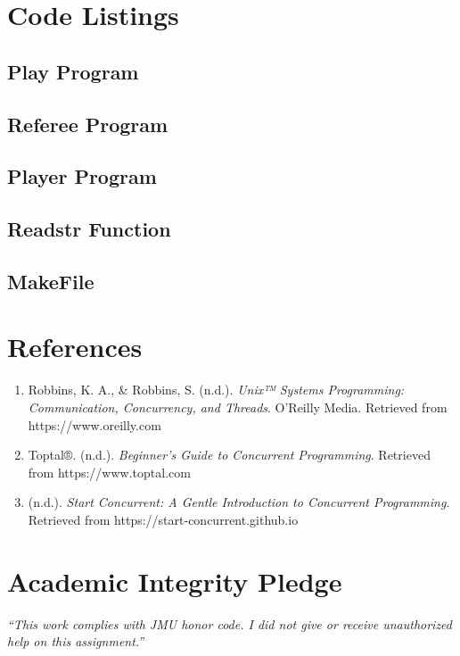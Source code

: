 \documentclass{article}
\begin{document}
\section{Code Listings}
\subsection{Play Program}


\subsection{Referee Program}


\subsection{Player Program}


\subsection{Readstr Function}


\subsection{MakeFile}


\section*{References}

\begin{enumerate}
  \item Robbins, K. A., \& Robbins, S. (n.d.). \textit{Unix™ Systems Programming: Communication, Concurrency, and Threads}. O'Reilly Media. Retrieved from https://www.oreilly.com
  \item Toptal®. (n.d.). \textit{Beginner's Guide to Concurrent Programming}. Retrieved from https://www.toptal.com
  \item (n.d.). \textit{Start Concurrent: A Gentle Introduction to Concurrent Programming}. Retrieved from https://start-concurrent.github.io
\end{enumerate}

\vfill
\section*{Academic Integrity Pledge}
{\color{red}\textit{“This work complies with JMU honor code. I did not give or receive unauthorized help on this assignment.”}}
\end{document}
